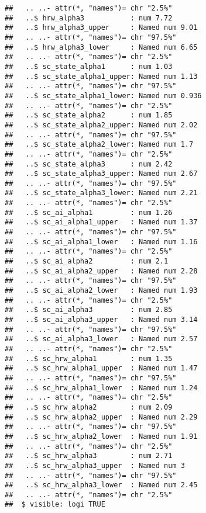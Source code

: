 \documentclass[12pt,letterpaper,leqno]{article}\usepackage[]{graphicx}\usepackage[]{color}
\makeatletter
\newenvironment{kframe}{%
 \def\at@end@of@kframe{}%
 \ifinner\ifhmode%
  \def\at@end@of@kframe{\end{minipage}}%
  \begin{minipage}{\columnwidth}%
 \fi\fi%
 \def\FrameCommand##1{\hskip\@totalleftmargin \hskip-\fboxsep
 \colorbox{shadecolor}{##1}\hskip-\fboxsep
     \hskip-\linewidth \hskip-\@totalleftmargin \hskip\columnwidth}%
 \MakeFramed {\advance\hsize-\width
   \@totalleftmargin\z@ \linewidth\hsize
   \@setminipage}}%
 {\par\unskip\endMakeFramed%
 \at@end@of@kframe}
\newenvironment{knitrout}{}{} %
\makeatother
\begin{document}
\begin{knitrout}
\begin{kframe}
\begin{verbatim}
##   .. ..- attr(*, "names")= chr "2.5%"
##   ..$ hrw_alpha3           : num 7.72
##   ..$ hrw_alpha3_upper     : Named num 9.01
##   .. ..- attr(*, "names")= chr "97.5%"
##   ..$ hrw_alpha3_lower     : Named num 6.65
##   .. ..- attr(*, "names")= chr "2.5%"
##   ..$ sc_state_alpha1      : num 1.03
##   ..$ sc_state_alpha1_upper: Named num 1.13
##   .. ..- attr(*, "names")= chr "97.5%"
##   ..$ sc_state_alpha1_lower: Named num 0.936
##   .. ..- attr(*, "names")= chr "2.5%"
##   ..$ sc_state_alpha2      : num 1.85
##   ..$ sc_state_alpha2_upper: Named num 2.02
##   .. ..- attr(*, "names")= chr "97.5%"
##   ..$ sc_state_alpha2_lower: Named num 1.7
##   .. ..- attr(*, "names")= chr "2.5%"
##   ..$ sc_state_alpha3      : num 2.42
##   ..$ sc_state_alpha3_upper: Named num 2.67
##   .. ..- attr(*, "names")= chr "97.5%"
##   ..$ sc_state_alpha3_lower: Named num 2.21
##   .. ..- attr(*, "names")= chr "2.5%"
##   ..$ sc_ai_alpha1         : num 1.26
##   ..$ sc_ai_alpha1_upper   : Named num 1.37
##   .. ..- attr(*, "names")= chr "97.5%"
##   ..$ sc_ai_alpha1_lower   : Named num 1.16
##   .. ..- attr(*, "names")= chr "2.5%"
##   ..$ sc_ai_alpha2         : num 2.1
##   ..$ sc_ai_alpha2_upper   : Named num 2.28
##   .. ..- attr(*, "names")= chr "97.5%"
##   ..$ sc_ai_alpha2_lower   : Named num 1.93
##   .. ..- attr(*, "names")= chr "2.5%"
##   ..$ sc_ai_alpha3         : num 2.85
##   ..$ sc_ai_alpha3_upper   : Named num 3.14
##   .. ..- attr(*, "names")= chr "97.5%"
##   ..$ sc_ai_alpha3_lower   : Named num 2.57
##   .. ..- attr(*, "names")= chr "2.5%"
##   ..$ sc_hrw_alpha1        : num 1.35
##   ..$ sc_hrw_alpha1_upper  : Named num 1.47
##   .. ..- attr(*, "names")= chr "97.5%"
##   ..$ sc_hrw_alpha1_lower  : Named num 1.24
##   .. ..- attr(*, "names")= chr "2.5%"
##   ..$ sc_hrw_alpha2        : num 2.09
##   ..$ sc_hrw_alpha2_upper  : Named num 2.29
##   .. ..- attr(*, "names")= chr "97.5%"
##   ..$ sc_hrw_alpha2_lower  : Named num 1.91
##   .. ..- attr(*, "names")= chr "2.5%"
##   ..$ sc_hrw_alpha3        : num 2.71
##   ..$ sc_hrw_alpha3_upper  : Named num 3
##   .. ..- attr(*, "names")= chr "97.5%"
##   ..$ sc_hrw_alpha3_lower  : Named num 2.45
##   .. ..- attr(*, "names")= chr "2.5%"
##  $ visible: logi TRUE
\end{verbatim}
\end{kframe}
\end{knitrout}
\end{document}
